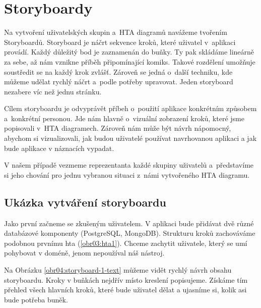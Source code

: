 \chapter{Storyboardy}

Na vytvoření uživatelských skupin a~HTA diagramů navážeme tvořením Storyboardů. Storyboard je náčrt sekvence kroků, které uživatel v~aplikaci provádí. Každý důležitý bod je zaznamenán do buňky. Ty pak skládáme lineárně za sebe, až nám vznikne příběh připomínající komiks. Takové rozdělení umožňuje soustředit se na každý krok zvlášť. Zároveň se jedná o~další techniku, kde můžeme udělat rychlý náčrt a~podle potřeby upravovat. Jeden storyboard nezabere víc než jednu stránku.

Cílem storyboardu je odvyprávět příbeh o~použití aplikace konkrétním způsobem a~konkrétní personou. Jde nám hlavně o~vizuální zobrazení kroků, které jsme popisovali v~HTA diagramech. Zároveň nám může být návrh nápomocný, abychom si vizualizovali, jak budou uživatelé používat navrhovanou aplikaci a jak bude aplikace v náznacích vypadat.

V našem případě vezmeme reprezentanta každé skupiny uživatelů a~představíme si jeho chování pro jednu vybranou situaci z~námi vytvořeného HTA diagramu.

\section{Ukázka vytváření storyboardu}

Jako první začneme se zkušeným uživatelem. V aplikaci bude přidávat dvě různé databázové komponenty (PostgreSQL, MongoDB). Strukturu kroků zachováváme podobnou prvnímu hta (\ref{obr03:hta1}). Chceme zachytit uživatele, který se umí pohybovat v doméně, jenom nepoužíval náš nástroj.

Na Obrázku \ref{obr04:storyboard-1-text} můžeme vidět rychlý návrh obsahu storyboardu. Kroky v buňkách nejdřív místo kreslení popisujeme. Získáme tím přehled všech hlavních kroků, které bude uživatel dělat a ujasníme si, kolik asi bude potřeba buněk.

